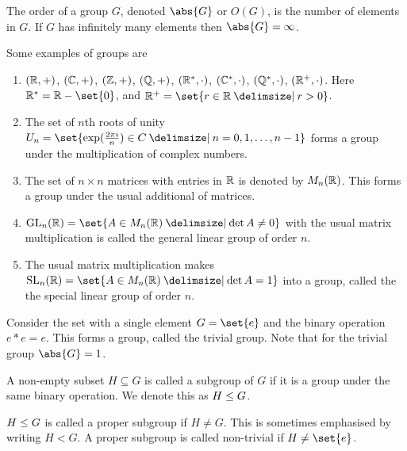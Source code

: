 \documentclass[11pt]{penrose}
\newcommand{\keyword}[1]{\textsf{#1}}
\begin{document}
\begin{ndfn}
    The \keyword{order} of a group $G$, denoted $\abs{G}$ or $O(G)$, is the number of elements in $G$. If $G$ has infinitely many elements then $\abs{G} = \infty$.
\end{ndfn}

\begin{egg}
    Some examples of groups are
    \begin{enumerate}
        \item $(\mathbb{R},+)$, $(\mathbb{C},+)$, $(\mathbb{Z},+)$, $(\mathbb{Q},+)$, $(\mathbb{R}^{*},\cdot)$, $(\mathbb{C}^{*},\cdot)$, $(\mathbb{Q}^{*},\cdot)$, $(\mathbb{R}^{+},\cdot)$. Here $\R^{*} = \R - \set{0}$, and $\R^{+} = \set{r \in \R \st r > 0}$.
        \item The set of $n$th roots of unity $U_n = \set{\exp(\frac{2\pi i}{n}) \in C \st n = 0, 1, \dots, n-1}$ forms a group under the multiplication of complex numbers.
        \item The set of $n \times n$ matrices with entries in $\mathbb{R}$ is denoted by $M_{n}(\mathbb{R})$. This forms a group under the usual additional of matrices.
        \item $\GL_{n}(\R) = \set{A \in M_{n}(\R) \st \det A \neq 0}$ with the usual matrix multiplication is called the \keyword{general linear group} of order $n$.
        \item The usual matrix multiplication makes $\SL_{n}(\R) = \set{A \in M_{n}(\R) \st \det A = 1}$ into a group, called the the \keyword{special linear group} of order $n$.
    \end{enumerate}
\end{egg}

\begin{negg}
    Consider the set with a single element $G = \set{e}$ and the binary operation $e * e = e$. This forms a group, called the \keyword{trivial group}. Note that for the trivial group $\abs{G} = 1$.
\end{negg}

\begin{ndfn}
    A non-empty subset $H \subseteq G$ is called a \keyword{subgroup} of $G$ if it is a group under the same binary operation. We denote this as $H \mathrel{\leq} G$.
\end{ndfn}

\begin{ndfn}
    $H \mathrel{\leq} G$ is called a \keyword{proper subgroup} if $H \neq G$. This is sometimes emphasised by writing $H < G$. A proper subgroup is called non-trivial if $H \neq \set{e}$.
\end{ndfn}
\end{document}
